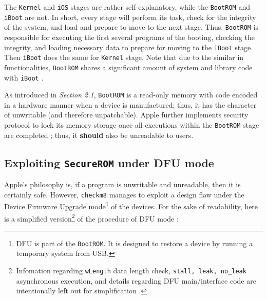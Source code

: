 \documentclass[10pt]{article}
\newcommand{\inlinecode}{\texttt}
\begin{document}
The \inlinecode{Kernel} and \inlinecode{iOS} stages are rather self-explanatory, while the \inlinecode{BootROM} and \inlinecode{iBoot} are not. In short, every stage will perform its task, check for the integrity of the system, and load and prepare to move to the next stage. Thus, \inlinecode{BootROM} is responsible for executing the first several programs of the booting, checking the integrity, and loading necessary data to prepare for moving to the \inlinecode{iBoot} stage. Then \inlinecode{iBoot} does the same for \inlinecode{Kernel} stage. Note that due to the similar in functionalities, \inlinecode{BootROM} shares a significant amount of system and library code with \inlinecode{iBoot} \cite{cite:4}.

As introduced in \textit{Section 2.1}, \inlinecode{BootROM} is a read-only memory with code encoded in a hardware manner when a device is manufactured; thus, it has the character of unwritable (and therefore unpatchable). Apple further implements security protocol to lock its memory storage once all executions within the \inlinecode{BootROM} stage are completed \cite{cite:4}\cite{cite:1}; thus, it \textbf{should} also be unreadable to users.

\subsection{Exploiting \inlinecode{SecureROM} under DFU mode}

Apple's philosophy is, if a program is unwritable and unreadable, then it is certainly safe. However, \inlinecode{checkm8} manages to exploit a design flaw under the Device Firmware Upgrade mode\footnote{DFU is part of the \inlinecode{BootROM}. It is designed to restore a device by running a temporary system from USB.} of the devices. For the sake of readability, here is a simplified version\footnote{Infomation regarding \inlinecode{wLength} data length check, \inlinecode{stall, leak, no\_leak} asynchronous execution, and details regarding DFU main/interface code are intentionally left out for simplification \cite{cite:4}.} of the procedure of DFU mode \cite{cite:4}\cite{cite:1}\cite{cite:5}:
\end{document}
